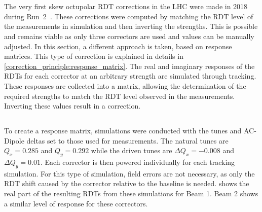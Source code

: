 \section{}

The very first skew octupolar RDT corrections in the LHC were made in 2018 during
Run~2~\cite{carlier_nonlinear_2020}. These corrections were computed by matching the RDT level of
the measurements in simulation and then inverting the strengths. This is possible and remains viable
as only three correctors are used and values can be manually adjusted.
In this section, a different approach is taken, based on response matrices. This type of correction
is explained in details in \cref{correction_principle:response_matrix}. The real and imaginary 
responses of the RDTs for each corrector at an arbitrary strength are simulated through tracking.
These responses are collected into a matrix, allowing the determination of the required strengths to
match the RDT level observed in the measurements. Inverting these values result in a correction.


\subsection{}

To create a response matrix, simulations were conducted with the tunes and AC-Dipole deltas set to
those used for measurements. The natural tunes are $Q_x = 0.285$ and $Q_y = 0.292$ while the driven
tunes are $\Delta Q_x = -0.008$ and $\Delta Q_y = 0.01$. Each corrector is then powered
individually for each tracking simulation. For this type of simulation, field errors are not
necessary, as only the RDT shift caused by the corrector relative to the baseline is needed.
 shows the real part of the resulting RDTs from these
simulations for Beam 1. Beam 2 shows a similar level of response for these correctors.

